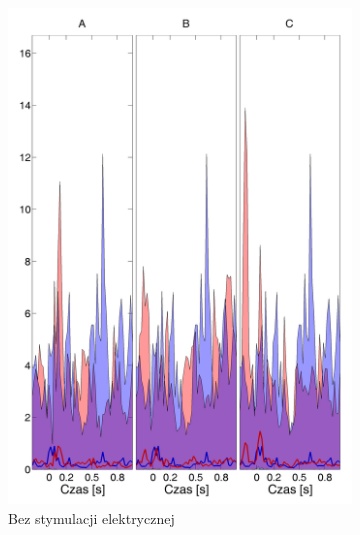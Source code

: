 \documentclass{pracamgr_2}
\begin{document}
	\begin{figure}[h]
		\begin{subfigure}{.5\textwidth}
			\centering
			\includegraphics[width=1.\linewidth]{kontrola15_10-30_z_CxC8_do_LGN82.png}
			\caption{Bez stymulacji elektrycznej}
			\label{rys:10_30_kon_CxC_LGN}
		\end{subfigure}%
		\begin{subfigure}{.5\textwidth}

\end{subfigure}
\end{figure}
\end{document}
